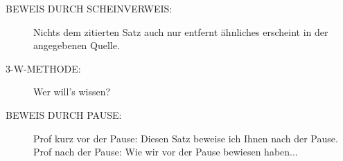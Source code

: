 \begin{description}
    \item [BEWEIS DURCH SCHEINVERWEIS:] Nichts dem zitierten Satz auch nur
    entfernt ähnliches erscheint in der angegebenen Quelle.
    
    \item [3-W-METHODE:] Wer will's wissen?
    
    \item [BEWEIS DURCH PAUSE:] Prof kurz vor der Pause: Diesen Satz beweise ich
    Ihnen nach der Pause. Prof nach der Pause: Wie wir vor der Pause
    bewiesen haben...
\end{description}
